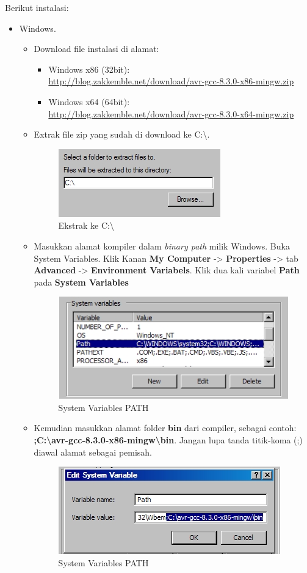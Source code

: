 \documentclass[12pt,]{article}
\begin{document}
	Berikut instalasi:
	\begin{itemize}
		\item Windows.
		\begin{itemize}
			\item Download file instalasi di alamat:
			\begin{itemize}
				\item Windows x86 (32bit):\\
				\url{http://blog.zakkemble.net/download/avr-gcc-8.3.0-x86-mingw.zip}
				\item Windows x64 (64bit):\\
				\url{http://blog.zakkemble.net/download/avr-gcc-8.3.0-x64-mingw.zip}
			\end{itemize}

			\item Extrak file zip yang sudah di download ke C:\textbackslash.
			\begin{figure}[H]
				\centering
				\includegraphics[width=0.35\linewidth]{images/avrgcc_0a}
				\caption{Ekstrak ke C:\textbackslash}
			\end{figure}

			\item Masukkan alamat kompiler dalam \textit{binary path} milik Windows.
			Buka System Variables. Klik Kanan \textbf{My Computer} -> \textbf{Properties} -> tab \textbf{Advanced} -> \textbf{Environment Variabels}.
			Klik dua kali variabel \textbf{Path} pada \textbf{System Variables}

			\begin{figure}[H]
				\centering
				\includegraphics[width=0.35\linewidth]{images/avrgcc_0b}
				\caption{System Variables PATH}
			\end{figure}

			\item Kemudian masukkan alamat folder \textbf{bin} dari compiler, sebagai contoh:\\
			\textbf{;C:\textbackslash avr-gcc-8.3.0-x86-mingw\textbackslash bin}.
			Jangan lupa tanda titik-koma (;) diawal alamat sebagai pemisah.
			\begin{figure}[H]
				\centering
				\includegraphics[width=0.35\linewidth]{images/avrgcc_0c}
				\caption{System Variables PATH}
			\end{figure}


\end{itemize}
\end{itemize}
\end{document}
